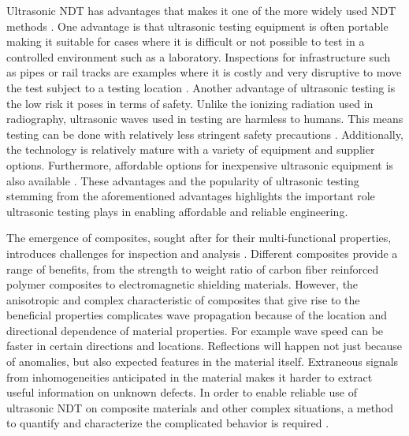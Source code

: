 Ultrasonic NDT has advantages that makes it one of the more widely used NDT methods \autocite{howell2020nondestructive, nivenFullWaveformInversion2020, feliceSizingFlawsUsing2018}. One advantage is that ultrasonic testing equipment is often portable making it suitable for cases where it is difficult or not possible to test in a controlled environment such as a laboratory. Inspections for infrastructure such as pipes or rail tracks are examples where it is costly and very disruptive to move the test subject to a testing location \autocite{}. Another advantage of ultrasonic testing is the low risk it poses in terms of safety. Unlike the ionizing radiation used in radiography, ultrasonic waves used in testing are harmless to humans. This means testing can be done with relatively less stringent safety precautions \autocite{}. Additionally, the technology is relatively mature with a variety of equipment and supplier options. Furthermore, affordable options for inexpensive ultrasonic equipment is also available \autocite{}. These advantages and the popularity of ultrasonic testing stemming from the aforementioned advantages highlights the important role ultrasonic testing plays in enabling affordable and reliable engineering.


The emergence of composites, sought after for their multi-functional properties, introduces challenges for inspection and analysis \autocites{inceOverviewEmergingHybrid2023, yangUltrasonicDetectionMethods2023, dwivediAdvancesResearchesNon2018, nivenFullWaveformInversion2020}. Different composites provide a range of benefits, from the strength to weight ratio of carbon fiber reinforced polymer composites to electromagnetic shielding materials. However, the anisotropic and complex characteristic of composites that give rise to the beneficial properties complicates wave propagation because of the location and directional dependence of material properties. For example wave speed can be faster in certain directions and locations. Reflections will happen not just because of anomalies, but also expected features in the material itself. Extraneous signals from inhomogeneities anticipated in the material makes it harder to extract useful information on unknown defects. In order to enable reliable use of ultrasonic NDT on composite materials and other complex situations, a method to quantify and characterize the complicated behavior is required \autocite{maioUltrasoundPropagationComposite2022}.

